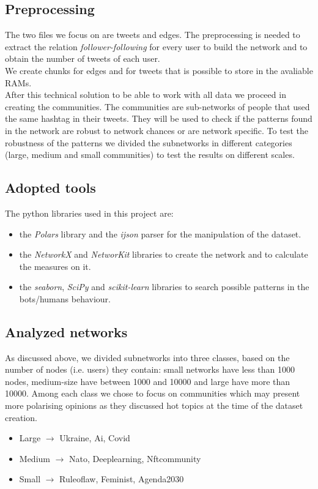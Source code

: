 \documentclass[12pt, a4paper]{article}
\begin{document}
	\subsection{Preprocessing}
        The two files we focus on are tweets and edges. The preprocessing is needed to extract the relation \textit{follower-following} for every user to build the network and to obtain the number of tweets of each user.\\
        We create chunks for edges and for tweets that is possible to store in the avaliable RAMs.\\
        After this technical solution to be able to work with all data we proceed in creating the communities. The communities are sub-networks of people that used the same hashtag in their tweets. They will be used to check if the patterns found in the network are robust to network chances or are network specific. To test the robustness of the patterns we divided the subnetworks in different categories (large, medium and small communities) to test the results on different scales.
	\subsection{Adopted tools}
		The python libraries used in this project are:
        \begin{itemize}
            \item the \textit{Polars} library and the \textit{ijson} parser for the manipulation of the dataset.
            \item the \textit{NetworkX} and \textit{NetworKit} libraries to create the network and to calculate the measures on it.
            \item the \textit{seaborn}, \textit{SciPy} and \textit{scikit-learn} libraries to search possible patterns in the bots/humans behaviour.
        \end{itemize}
	\subsection{Analyzed networks}
    	As discussed above, we divided subnetworks into three classes, based on the number of nodes (i.e. users) they contain: small networks have less than 1000 nodes, medium-size have between 1000 and 10000 and large have more than 10000. Among each class we chose to focus on communities which may present more polarising opinions as they discussed hot topics at the time of the dataset creation.
		\begin{itemize}
			\item Large $\rightarrow$ Ukraine, Ai, Covid
			\item Medium $\rightarrow$ Nato, Deeplearning, Nftcommunity
			\item Small $\rightarrow$ Ruleoflaw, Feminist, Agenda2030
		\end{itemize}
\end{document}
